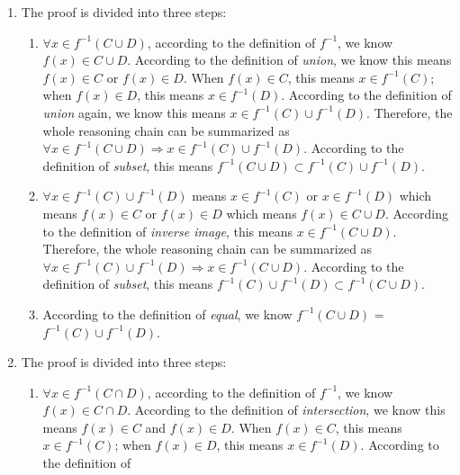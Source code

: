 \documentclass[12pt, letterpaper, oneside]{book}
\begin{document}
\begin{enumerate}
  \item The proof is divided into three steps:
        \begin{enumerate}
          \item $\forall x \in f^{-1}(C \cup D)$, according to the definition of
                $f^{-1}$, we know $f(x) \in C \cup D$. According to the definition of
                \textit{union}, we know this means $f(x) \in C$ or $f(x) \in D$. When
                $f(x) \in C$, this means $x \in f^{-1}(C)$; when $f(x) \in D$, this
                means $x \in f^{-1}(D)$. According to the definition of \textit{union}
                again, we know this means $x \in f^{-1}(C) \cup f^{-1}(D)$. Therefore,
                the whole reasoning chain can be summarized as $\forall x \in f^{-1}(C
                  \cup D) \Rightarrow x \in f^{-1}(C) \cup f^{-1}(D)$. According to the
                definition of \textit{subset}, this means $f^{-1}(C \cup D) \subset
                  f^{-1}(C) \cup f^{-1}(D)$.
          \item $\forall x \in f^{-1}(C) \cup f^{-1}(D)$ means $x \in f^{-1}(C)$ or
                $x \in f^{-1}(D)$ which means $f(x) \in C$ or $f(x) \in D$ which means
                $f(x) \in C \cup D$. According to the definition of \textit{inverse
                  image}, this means $x \in f^{-1}(C \cup D)$. Therefore, the whole
                reasoning chain can be summarized as $\forall x \in f^{-1}(C) \cup
                  f^{-1}(D) \Rightarrow x \in f^{-1}(C \cup D)$. According to the
                definition of \textit{subset}, this means $f^{-1}(C) \cup f^{-1}(D)
                  \subset f^{-1}(C \cup D)$.
          \item According to the definition of \textit{equal}, we know $f^{-1}(C
                  \cup D)$ = $f^{-1}(C) \cup f^{-1}(D)$.
        \end{enumerate}
  \item The proof is divided into three steps:
        \begin{enumerate}
          \item $\forall x \in f^{-1}(C \cap D)$, according to the definition of
                $f^{-1}$, we know $f(x) \in C \cap D$. According to the definition of
                \textit{intersection}, we know this means $f(x) \in C$ and $f(x) \in D$.
                When $f(x) \in C$, this means $x \in f^{-1}(C)$; when $f(x) \in D$, this
                means $x \in f^{-1}(D)$. According to the definition of \textit{
}
\end{enumerate}
\end{enumerate}
\end{document}
